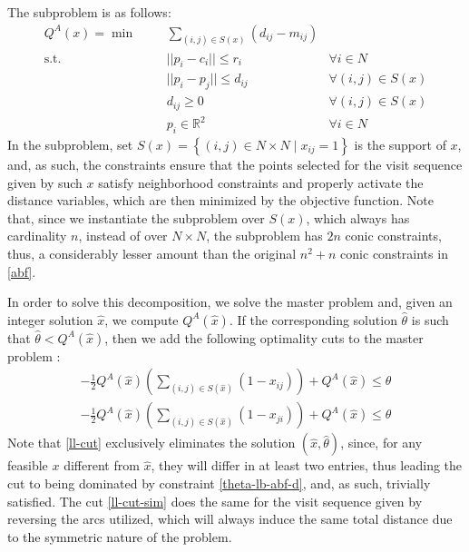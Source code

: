 \documentclass[pdflatex,sn-mathphys-num]{sn-jnl}%
\begin{document}
The subproblem is as follows:
\begin{subequations}
\begin{align}
Q^A(x) = \min &&& \sum_{(i,j) \in S(x)} \left(d_{ij} - m_{ij}\right) & \label{obj-subpr-abf}\\
\text{s.t.} &&& ||p_i - c_i|| \leq r_i &\forall i \in N \label{neigh-abf-d}\\
&&& ||p_i - p_j|| \leq d_{ij} &\forall (i,j) \in S(x) \label{dist-abf-d}\\
&&& d_{ij}\geq 0 &\forall (i,j) \in S(x) \label{d-abf-d}\\
&&& p_i \in \mathbb{R}^2 &\forall i \in N \label{p-abf-d}
\end{align}
\end{subequations}
In the subproblem, set $S(x) = \left\{(i,j) \in N \times N \mid x_{ij} = 1\right\}$ is the support of $x$, and, as such, the constraints ensure that the points selected for the visit sequence given by such $x$ satisfy neighborhood constraints and properly activate the distance variables, which are then minimized by the objective function. Note that, since we instantiate the subproblem over $S(x)$, which always has cardinality $n$, instead of over $N \times N$, the subproblem has $2n$ conic constraints, thus, a considerably lesser amount than the original $n^2 + n$ conic constraints in \ref{abf}.

 In order to solve this decomposition, we solve the master problem and, given an integer solution $\hat{x}$, we compute $Q^A(\hat{x})$. If the corresponding solution $\hat{\theta}$ is such that $\hat{\theta} < Q^A(\hat{x})$, then we add the following optimality cuts to the master problem \cite{ILSM}:
\begin{subequations}
\begin{gather}
     -\frac{1}{2}Q^A(\hat{x})\left(\sum_{(i,j) \in S(\hat{x})} (1 - x_{ij})\right) + Q^A(\hat{x}) \leq \theta \label{ll-cut}\\
     -\frac{1}{2}Q^A(\hat{x})\left(\sum_{(i,j) \in S(\hat{x})} (1 - x_{ji})\right) + Q^A(\hat{x}) \leq \theta \label{ll-cut-sim}
\end{gather}
\end{subequations}
Note that \eqref{ll-cut} exclusively eliminates the solution $\left(\hat{x},\hat{\theta}\right)$, since, for any feasible $x$ different from $\hat{x}$, they will differ in at least two entries, thus leading the cut to being dominated by constraint \eqref{theta-lb-abf-d}, and, as such, trivially satisfied. The cut \eqref{ll-cut-sim} does the same for the visit sequence given by reversing the arcs utilized, which will always induce the same total distance due to the symmetric nature of the problem.
\end{document}
